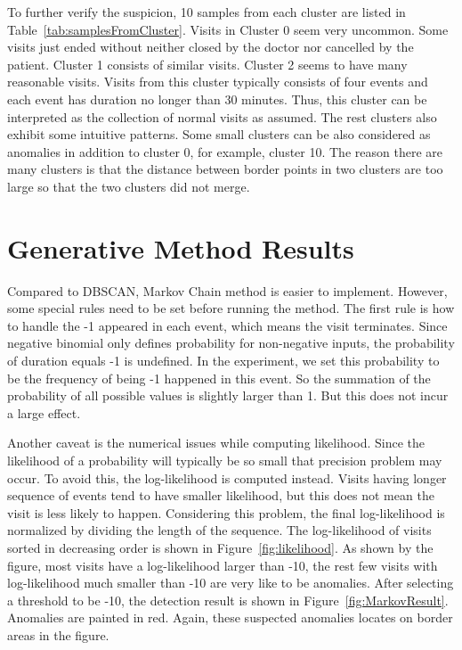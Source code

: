 To further verify the suspicion, 10 samples from each cluster are listed in Table~\ref{tab:samplesFromCluster}. Visits in Cluster 0 seem very uncommon. Some visits just ended without neither closed by the doctor nor cancelled by the patient. Cluster 1 consists of similar visits. Cluster 2 seems to have many reasonable visits. Visits from this cluster typically consists of four events and each event has duration no longer than 30 minutes. Thus, this cluster can be interpreted as the collection of normal visits as assumed. The rest clusters also exhibit some intuitive patterns. Some small clusters can be also considered as anomalies in addition to cluster 0, for example, cluster 10. The reason there are many clusters is that the distance between border points in two clusters are too large so that the two clusters did not merge. 

\section{Generative Method Results}
\label{sec:generative}
Compared to DBSCAN, Markov Chain method is easier to implement. However, some special rules need to be set before running the method. The first rule is how to handle the -1 appeared in each event, which means the visit terminates. Since negative binomial only defines probability for non-negative inputs, the probability of duration equals -1 is undefined. In the experiment, we set this probability to be the frequency of being -1 happened in this event. So the summation of the probability of all possible values is slightly larger than 1. But this does not incur a large effect.

Another caveat is the numerical issues while computing likelihood. Since the likelihood of a probability will typically be so small that precision problem may occur. To avoid this, the log-likelihood is computed instead. Visits having longer sequence of events tend to have smaller likelihood, but this does not mean the visit is less likely to happen. Considering this problem, the final log-likelihood is normalized by dividing the length of the sequence. The log-likelihood of visits sorted in decreasing order is shown in Figure~\ref{fig:likelihood}. As shown by the figure, most visits have a log-likelihood larger than -10, the rest few visits with log-likelihood much smaller than -10 are very like to be anomalies. After selecting a threshold to be -10, the detection result is shown in Figure~\ref{fig:MarkovResult}. Anomalies are painted in red. Again, these suspected anomalies locates on border areas in the figure.

